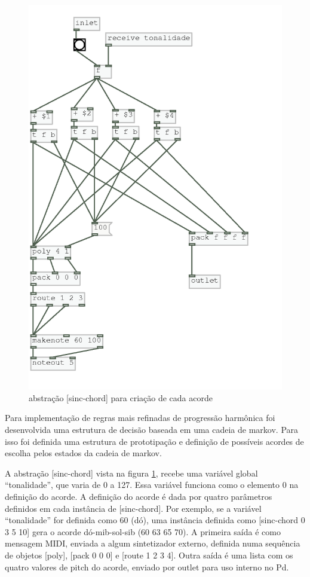 \documentclass{ppgmus}
\begin{document}
\begin{figure}
\includegraphics[scale=.6]{sinc-chord}
\caption{abstração [sinc-chord] para criação de cada acorde }
\label{sinc-chord}
\end{figure}


Para implementação de regras mais refinadas de progressão harmônica foi desenvolvida uma
estrutura de decisão baseada em uma cadeia de markov. Para isso foi definida uma
estrutura de prototipação e definição de possíveis acordes de escolha pelos estados
da cadeia de markov.

A abstração [sinc-chord] vista na figura \ref{sinc-chord}, recebe uma variável global
``tonalidade'',  que varia de 0 a 127. Essa variável funciona como o elemento 0 na definição
do acorde. A definição do acorde é dada por quatro parâmetros definidos em cada instância
de [sinc-chord]. Por exemplo, se a variável ``tonalidade'' for definida como 60 (dó), uma instância 
definida como [sinc-chord 0 3 5 10] gera o acorde dó-mib-sol-sib (60 63 65 70).
A primeira saída é como mensagem MIDI, enviada a algum sintetizador externo, definida numa sequência
de objetos [poly], [pack 0 0 0] e [route 1 2 3 4]. Outra saída é uma lista com os quatro valores
de pitch do acorde, enviado por outlet para uso interno no Pd.
\end{document}
